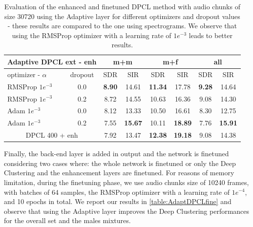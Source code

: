 \documentclass[master, tikz, final,11pt, dvipdfmx]{iscs-thesis}
\begin{document}
\begin{table}[h]
\centering
\begin{tabular}{l|c|c|c|c|c|c|c}
\multicolumn{2}{c|}{Adaptive DPCL ext - enh} & \multicolumn{2}{c|}{m+m} & \multicolumn{2}{c|}{m+f} & \multicolumn{2}{c}{all} \\ 
\hline 
optimizer - $\alpha$ & dropout & SDR & SIR & SDR & SIR & SDR & SIR \\ 
\hline 
RMSProp $1e^{-3}$ & 0.0 & \cellcolor{green}\textbf{8.90} & \cellcolor{green}14.61 & \cellcolor{green}\textbf{11.34} & 1\cellcolor{green}7.78 & \cellcolor{green}\textbf{9.28} & \cellcolor{green}14.64 \\ 
RMSProp $1e^{-3}$ & 0.2 & 8.72 & 14.55 & 10.63 & 16.36 & 9.08 & 14.30 \\ 
Adam $1e^{-3}$ & 0.0 & 8.12 & 13.33 & 10.50 & 16.61 & 8.30 & 12.75 \\ 
Adam $1e^{-3}$ & 0.2 & 7.55 & \textbf{15.67} & 10.11 & \textbf{18.89} & 7.76 & \textbf{15.91} \\ 
\hline 
\hline 
\multicolumn{2}{c|}{DPCL 400 + enh}
 & 7.92 & 13.47 & \textbf{12.38} & \textbf{19.18} & 9.08 & 14.38 \\ 
\end{tabular}
\caption[Evaluation of the enhanced and finetuned DPCL method with audio chunks of size 30720 using the Adaptive layer]{Evaluation of the enhanced and finetuned DPCL method with audio chunks of size 30720 using the Adaptive layer for different optimizers and dropout values - these results are compared to the one using spectrograms. We observe that using the RMSProp optimizer with a learning rate of $1e^{-3}$ leads to better results.}
\label{table:AdaptDPCLext}
\end{table}


Finally, the back-end layer is added in output and the network is finetuned considering two cases where: the whole network is finetuned or only the Deep Clustering and the enhancement layers are finetuned. For reasons of memory limitation, during the finetuning phase, we use audio chunks size of 10240 frames, with batches of 64 samples, the RMSProp optimizer with a learning rate of $1e^{-4}$, and 10 epochs in total. We report our results in \autoref{table:AdaptDPCLfine} and observe that using the Adaptive layer improves the Deep Clustering performances for the overall set and the males mixtures. 
\end{document}
